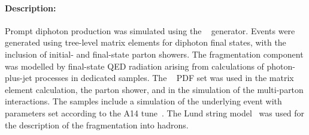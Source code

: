 \paragraph{Description:}

Prompt diphoton production was simulated using the
\PYTHIA[8.186]~\cite{Sjostrand:2007gs} generator. Events were
generated using tree-level matrix elements for diphoton final states,
with the inclusion of initial- and final-state parton showers.  The
fragmentation component was modelled by final-state QED radiation
arising from calculations of photon-plus-jet processes in dedicated
samples. The \NNPDF[2.3lo]~\cite{Ball:2012cx} PDF set was used in the
matrix element calculation, the parton shower, and in the simulation of the
multi-parton interactions. The samples include a simulation of the
underlying event with parameters set according to the A14
tune~\cite{ATL-PHYS-PUB-2014-021}. The Lund string
model~\cite{Andersson:1983ia,Sjostrand:1984ic} was used for the
description of the fragmentation into hadrons.

